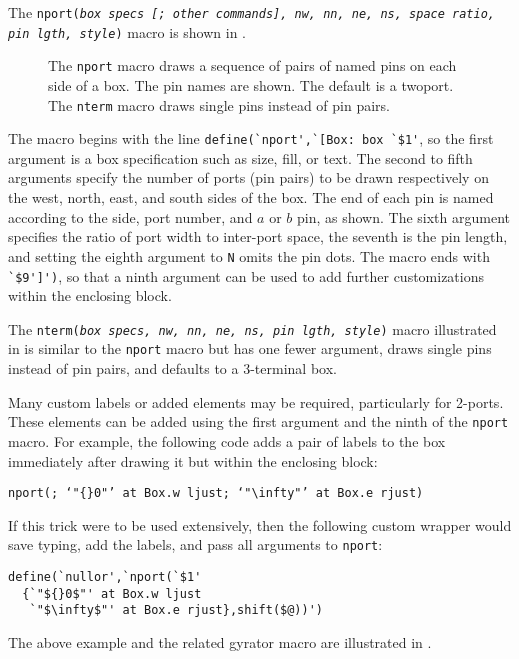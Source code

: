 The {\tt nport({\sl box specs {\tt[;} other commands{\tt]},
  nw, nn, ne, ns, space ratio, pin lgth, style})}
macro is shown in .
\begin{figure}[ht]
   
   \caption{The {\tt nport} macro draws a sequence of pairs of named pins
     on each side of a box.  The pin names are shown.  The default is a twoport.
     The {\tt nterm} macro draws single pins instead of pin pairs.}
   \label{Nport}
   \end{figure}
The macro begins with the line
 \verb|define(`nport',`[Box: box `$1'|,
so the first argument is a box specification such as size, fill,
or text.
The second to fifth arguments specify the number of ports
(pin pairs) to be drawn respectively on the west, north, east, and south
sides of the box.  The end of each pin is named according to the
side, port number, and $a$ or $b$ pin, as shown.
The sixth argument
specifies the ratio of port width to inter-port space, the seventh is
the pin length, and setting the eighth argument to {\tt N} omits the pin
dots.
The macro ends with \verb|`$9']')|, so that a ninth argument can be used
to add further customizations within the enclosing block.

The {\tt nterm({\sl box specs, nw, nn, ne, ns, pin lgth, style})} macro
illustrated in  is similar to the {\tt nport} macro but
has one fewer argument, draws single pins instead of pin pairs, and
defaults to a 3-terminal box.

Many custom labels or added elements may be required, particularly for
2-ports\label{Nports:}. These elements can be added using the first
argument and the ninth of the {\tt nport} macro.
For example, the following code adds a pair of labels to the box
immediately after drawing it but within the enclosing block:

{\tt nport(; {`"${}0$"'\ at Box.w ljust; `"$\infty$"'\ at
 Box.e rjust})}

If this trick were to be used extensively, then the following custom wrapper
would save typing, add the labels, and pass all arguments to
{\tt nport}:

\begin{verbatim}
define(`nullor',`nport(`$1'
  {`"${}0$"' at Box.w ljust
   `"$\infty$"' at Box.e rjust},shift($@))')
\end{verbatim}

The above example and the related gyrator macro are illustrated in
.\hfill\break

